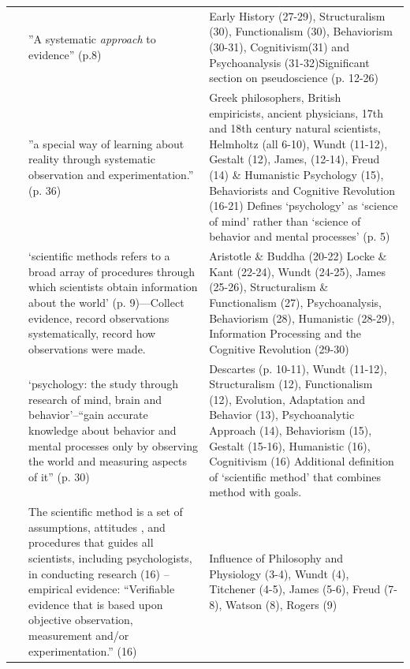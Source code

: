 \begin{refsection}
\begin{longtable}[!t]{ | P{2cm} | P{5cm} | P{7cm} | }
\hline
{} &  &  \\ \hline
~\citep{Lilienfeld:2014ws}&”A systematic \emph{approach} to evidence” (p.8)&Early History (27-29), Structuralism (30), Functionalism (30), Behaviorism (30-31), Cognitivism(31) and Psychoanalysis (31-32)\newline Significant section on pseudoscience (p. 12-26) \\ \hline
~\citep{Cacioppo:2018we}&”a special way of learning about reality through systematic observation and experimentation.” (p. 36) &Greek philosophers, British empiricists, ancient physicians, 17th and 18th century natural scientists, Helmholtz (all 6-10), Wundt (11-12), Gestalt (12), James, (12-14), Freud (14) \& Humanistic Psychology (15), Behaviorists and Cognitive Revolution (16-21) \newline Defines ‘psychology’ as ‘science of mind’ rather than ‘science of behavior and mental processes’ (p. 5) \\ \hline
~\citep{Cervone:2015ud}& ‘scientific methods refers to a broad array of procedures through which scientists obtain information about the world’ (p. 9)---Collect evidence, record observations systematically, record how observations were made.& Aristotle \& Buddha (20-22) Locke \& Kant (22-24), Wundt (24-25), James (25-26), Structuralism \& Functionalism (27), Psychoanalysis, Behaviorism (28), Humanistic (28-29), Information Processing and the Cognitive Revolution (29-30) \\ \hline
~\citep{Gazzaniga:2018tq}& ‘psychology: the study through research of mind, brain and behavior’--“gain accurate knowledge about behavior and mental processes only by observing the world and measuring aspects of it” (p. 30)&Descartes (p. 10-11), Wundt (11-12), Structuralism (12), Functionalism (12), Evolution, Adaptation and Behavior (13), Psychoanalytic Approach (14), Behaviorism (15), Gestalt (15-16), Humanistic (16), Cognitivism (16) \newline Additional definition of ‘scientific method’ that combines method with goals. \\ \hline
~\citep{Hockenbury:2014ws}&The scientific method is a set of assumptions, attitudes , and procedures that guides all scientists, including psychologists, in conducting research (16) -- empirical evidence: “Verifiable evidence that is based upon objective observation, measurement and/or experimentation.” (16)&Influence of Philosophy and Physiology (3-4), Wundt (4), Titchener (4-5), James (5-6), Freud (7-8), Watson (8), Rogers (9) \\ \hline

\end{longtable}
\end{refsection}
